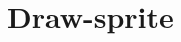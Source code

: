 \documentclass{scrreprt} %
\date{22 november 2013}
\begin{document}
\section{Draw-sprite}
\end{document}
